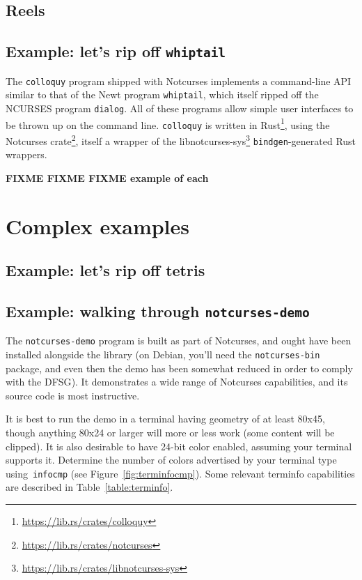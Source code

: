 \documentclass[letterpaper,10pt]{article}
\begin{document}
\subsection{Reels}
\subsection{Example: let's rip off \texttt{whiptail}}
The \texttt{colloquy} program shipped with Notcurses implements a command-line
API similar to that of the Newt program \texttt{whiptail}, which itself ripped
off the NCURSES program \texttt{dialog}. All of these programs allow simple
user interfaces to be thrown up on the command line. \texttt{colloquy} is
written in Rust\footnote{\url{https://lib.rs/crates/colloquy}}, using the
Notcurses crate\footnote{\url{https://lib.rs/crates/notcurses}}, itself a wrapper
of the libnotcurses-sys\footnote{\url{https://lib.rs/crates/libnotcurses-sys}}
\texttt{bindgen}-generated Rust wrappers.

\textbf{FIXME FIXME FIXME example of each}

\section{Complex examples}
\subsection{Example: let's rip off tetris}
\label{sec:casestudy}
\subsection{Example: walking through \texttt{notcurses-demo}}
\label{sec:ncdemo}
The \texttt{notcurses-demo} program is built as part of Notcurses, and ought
have been installed alongside the library (on Debian, you'll need the
\texttt{notcurses-bin} package, and even then the demo has been somewhat
reduced in order to comply with the DFSG\cite{dfsg}). It demonstrates a wide
range of Notcurses capabilities, and its source code is most instructive.

It is best to run the demo in a terminal having geometry of at least 80x45,
though anything 80x24 or larger will more or less work (some content will be
clipped). It is also desirable to have 24-bit color enabled, assuming your
terminal supports it. Determine the number of colors advertised by your
terminal type using~\texttt{infocmp} (see Figure~\ref{fig:terminfocmp}).
Some relevant terminfo capabilities are described in Table~\ref{table:terminfo}.
\end{document}
